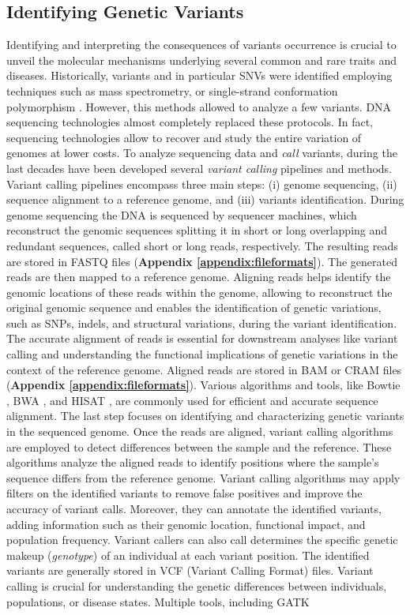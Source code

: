 \documentclass[a4paper, titlepage, openright]{book}
\begin{document}
\subsection{Identifying Genetic Variants}
Identifying and interpreting the consequences of variants occurrence is crucial to unveil the molecular mechanisms underlying several common and rare traits and diseases. Historically, variants and in particular SNVs were identified employing techniques such as mass spectrometry, or single-strand conformation polymorphism \citep{orita1989detection}. However, this methods allowed to analyze a few variants. DNA sequencing technologies almost completely replaced these protocols. In fact, sequencing technologies allow to recover and study the entire variation of genomes at lower costs. To analyze sequencing data and \emph{call} variants, during the last decades have been developed several \emph{variant calling} pipelines and methods. Variant calling pipelines encompass three main steps: (i) genome sequencing, (ii) sequence alignment to a reference genome, and (iii) variants identification. During genome sequencing the DNA is sequenced by sequencer machines, which reconstruct the genomic sequences splitting it in short or long overlapping and redundant sequences, called short or long reads, respectively. The resulting reads are stored in FASTQ files (\textbf{Appendix \ref{appendix:fileformats}}). The generated reads are then mapped to a reference genome. Aligning reads helps identify the genomic locations of these reads within the genome, allowing to reconstruct the original genomic sequence and enables the identification of genetic variations, such as SNPs, indels, and structural variations, during the variant identification. The accurate alignment of reads is essential for downstream analyses like variant calling and understanding the functional implications of genetic variations in the context of the reference genome. Aligned reads are stored in BAM or CRAM files (\textbf{Appendix \ref{appendix:fileformats}}). Various algorithms and tools, like Bowtie \citep{langmead2012fast}, BWA \citep{li2009fast}, and HISAT \citep{kim2019graph}, are commonly used for efficient and accurate sequence alignment. The last step focuses on identifying and characterizing genetic variants in the sequenced genome. Once the reads are aligned, variant calling algorithms are employed to detect differences between the sample and the reference. These algorithms analyze the aligned reads to identify positions where the sample's sequence differs from the reference genome. Variant calling algorithms may apply filters on the identified variants to remove false positives and improve the accuracy of variant calls. Moreover, they can annotate the identified variants, adding information such as their genomic location, functional impact, and population frequency. Variant callers can also call determines the specific genetic makeup (\emph{genotype}) of an individual at each variant position. The identified variants are generally stored in VCF (Variant Calling Format) files. Variant calling is crucial for understanding the genetic differences between individuals, populations, or disease states. Multiple tools, including GATK 
\end{document}

